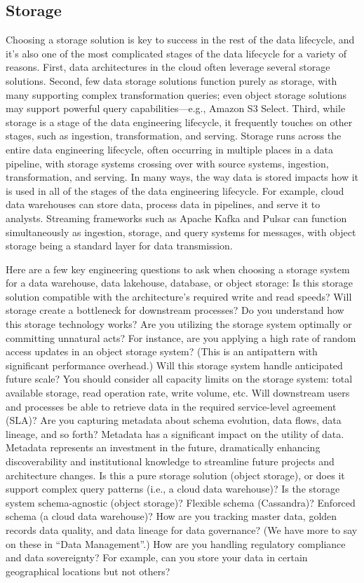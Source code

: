 \documentclass[12pt]{book}
\begin{document}
\subsection{Storage}
Choosing a storage solution is key to success
in the rest of the data lifecycle, and it’s also one of the most complicated
stages of the data lifecycle for a variety of reasons. First, data architectures
in the cloud often leverage several storage solutions. Second, few data
storage solutions function purely as storage, with many supporting complex
transformation queries; even object storage solutions may support powerful
query capabilities—e.g., Amazon S3 Select. Third, while storage is a stage
of the data engineering lifecycle, it frequently touches on other stages, such
as ingestion, transformation, and serving.
Storage runs across the entire data engineering lifecycle, often occurring in
multiple places in a data pipeline, with storage systems crossing over with
source systems, ingestion, transformation, and serving. In many ways, the
way data is stored impacts how it is used in all of the stages of the data
engineering lifecycle. For example, cloud data warehouses can store data,
process data in pipelines, and serve it to analysts. Streaming frameworks
such as Apache Kafka and Pulsar can function simultaneously as ingestion,
storage, and query systems for messages, with object storage being a
standard layer for data transmission.

Here are a few key engineering questions to ask when choosing a storage
system for a data warehouse, data lakehouse, database, or object storage:
Is this storage solution compatible with the architecture’s required
write and read speeds?
Will storage create a bottleneck for downstream processes?
Do you understand how this storage technology works? Are you
utilizing the storage system optimally or committing unnatural acts?
For instance, are you applying a high rate of random access updates in
an object storage system? (This is an antipattern with significant
performance overhead.)
Will this storage system handle anticipated future scale? You should
consider all capacity limits on the storage system: total available
storage, read operation rate, write volume, etc.
Will downstream users and processes be able to retrieve data in the
required service-level agreement (SLA)?
Are you capturing metadata about schema evolution, data flows, data
lineage, and so forth? Metadata has a significant impact on the utility
of data. Metadata represents an investment in the future, dramatically
enhancing discoverability and institutional knowledge to streamline
future projects and architecture changes.
Is this a pure storage solution (object storage), or does it support
complex query patterns (i.e., a cloud data warehouse)?
Is the storage system schema-agnostic (object storage)? Flexible
schema (Cassandra)? Enforced schema (a cloud data warehouse)?
How are you tracking master data, golden records data quality, and
data lineage for data governance? (We have more to say on these in
“Data Management”.)
How are you handling regulatory compliance and data sovereignty?
For example, can you store your data in certain geographical locations
but not others?
\end{document}
